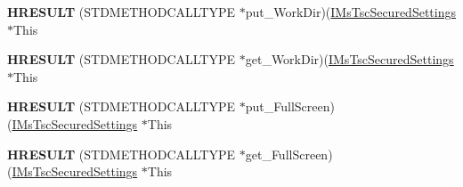 \begin{DoxyCompactItemize}
{\bfseries H\+R\+E\+S\+U\+LT} (S\+T\+D\+M\+E\+T\+H\+O\+D\+C\+A\+L\+L\+T\+Y\+PE $\ast$put\+\_\+\+Work\+Dir)(\hyperlink{interface_m_s_t_s_c_lib_1_1_i_ms_tsc_secured_settings}{I\+Ms\+Tsc\+Secured\+Settings} $\ast$This
\item 
\mbox{\label{struct_m_s_t_s_c_lib_1_1_i_ms_tsc_secured_settings_vtbl_ab2ab2b24a659e0d9db599359f30acdd7}} 
{\bfseries H\+R\+E\+S\+U\+LT} (S\+T\+D\+M\+E\+T\+H\+O\+D\+C\+A\+L\+L\+T\+Y\+PE $\ast$get\+\_\+\+Work\+Dir)(\hyperlink{interface_m_s_t_s_c_lib_1_1_i_ms_tsc_secured_settings}{I\+Ms\+Tsc\+Secured\+Settings} $\ast$This
\item 
\mbox{\label{struct_m_s_t_s_c_lib_1_1_i_ms_tsc_secured_settings_vtbl_a0adc45606b8959c0d495b0547cef2f6a}} 
{\bfseries H\+R\+E\+S\+U\+LT} (S\+T\+D\+M\+E\+T\+H\+O\+D\+C\+A\+L\+L\+T\+Y\+PE $\ast$put\+\_\+\+Full\+Screen)(\hyperlink{interface_m_s_t_s_c_lib_1_1_i_ms_tsc_secured_settings}{I\+Ms\+Tsc\+Secured\+Settings} $\ast$This
\item 
\mbox{\label{struct_m_s_t_s_c_lib_1_1_i_ms_tsc_secured_settings_vtbl_a958c5c69df3f72f133ca89c796858859}} 
{\bfseries H\+R\+E\+S\+U\+LT} (S\+T\+D\+M\+E\+T\+H\+O\+D\+C\+A\+L\+L\+T\+Y\+PE $\ast$get\+\_\+\+Full\+Screen)(\hyperlink{interface_m_s_t_s_c_lib_1_1_i_ms_tsc_secured_settings}{I\+Ms\+Tsc\+Secured\+Settings} $\ast$This
\end{DoxyCompactItemize}
